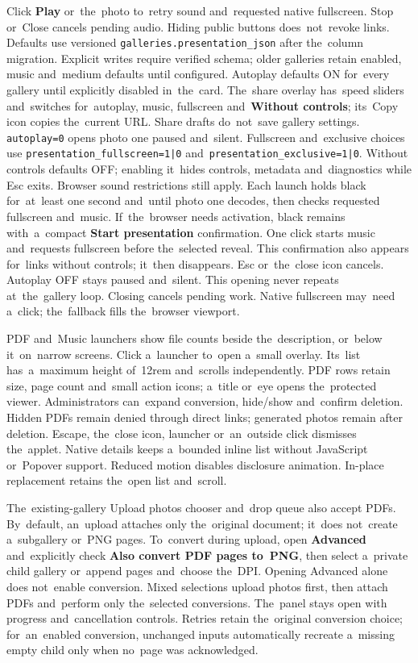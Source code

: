 \documentclass[11pt,a4paper]{article}
\newcommand{\ui}[1]{\textbf{#1}}
\newcommand{\codeword}[1]{\nolinkurl{#1}}
\begin{document}
Click \ui{Play} or~the~photo to~retry sound and~requested native fullscreen.
Stop or~Close cancels pending audio. Hiding public buttons does~not~revoke
links.
Defaults use versioned \codeword{galleries.presentation_json} after the~column
migration. Explicit writes require verified schema; older galleries retain
enabled, music and~medium defaults until configured.
Autoplay defaults ON for~every gallery until explicitly disabled in~the~card.
The~share overlay has~speed sliders and~switches for~autoplay, music,
fullscreen and~\ui{Without controls}; its~Copy icon copies the~current URL.
Share drafts do~not~save gallery settings. \codeword{autoplay=0} opens photo
one paused and~silent. Fullscreen and~exclusive choices use
\codeword{presentation_fullscreen=1|0}
and~\codeword{presentation_exclusive=1|0}.
Without controls defaults OFF; enabling it~hides controls, metadata
and~diagnostics while Esc exits. Browser sound restrictions still apply.
Each launch holds black for~at~least one second and~until photo one decodes,
then checks requested fullscreen and~music. If~the~browser needs activation,
black remains with~a~compact \ui{Start presentation} confirmation.
One click starts music and~requests fullscreen before the~selected reveal.
This confirmation also appears for~links without controls; it~then disappears.
Esc or~the~close icon cancels. Autoplay OFF stays paused and~silent.
This opening never repeats at~the~gallery loop. Closing cancels pending work.
Native fullscreen may~need a~click; the~fallback fills the~browser viewport.

PDF and~Music launchers show file counts beside the~description,
or~below it~on~narrow screens. Click a~launcher to~open a~small overlay.
Its~list has~a~maximum height of~12rem and~scrolls independently. PDF rows
retain size, page count and~small action icons; a~title or~eye opens
the~protected viewer. Administrators can~expand conversion, hide/show
and~confirm deletion. Hidden PDFs remain denied through direct links;
generated photos remain after deletion. Escape, the~close icon, launcher
or~an~outside click dismisses the~applet. Native details keeps a~bounded
inline list without JavaScript or~Popover support. Reduced motion disables
disclosure animation. In-place replacement retains the~open list and~scroll.

The~existing-gallery Upload photos chooser and~drop queue also accept PDFs.
By~default, an~upload attaches only the~original document; it~does not~create
a~subgallery or~PNG pages. To~convert during upload, open \ui{Advanced}
and~explicitly check \ui{Also convert PDF pages to~PNG}, then select a~private
child gallery or~append pages and~choose the~DPI. Opening Advanced alone does
not~enable conversion. Mixed selections upload photos first, then attach PDFs
and~perform only the~selected conversions. The~panel stays open with progress
and~cancellation controls. Retries retain the~original conversion choice;
for~an~enabled conversion, unchanged inputs automatically recreate a~missing
empty child only when no~page was acknowledged.
\end{document}
